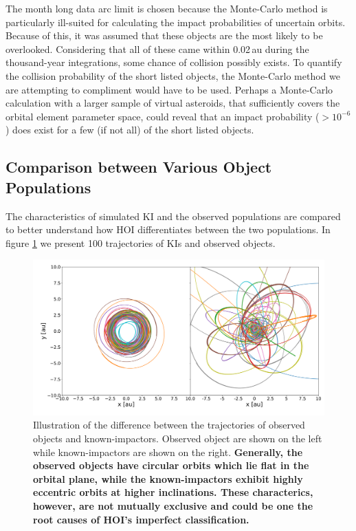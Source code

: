 \documentclass{aa}
\begin{document}
The month long data arc limit is chosen because the Monte-Carlo method is particularly ill-suited for calculating the impact probabilities of uncertain orbits. Because of this, it was assumed that these objects are the most likely to be overlooked. Considering that all of these came within 0.02\,au during the thousand-year integrations, some chance of collision possibly exists. To quantify the collision probability of the short listed objects, the Monte-Carlo method we are attempting to compliment would have to be used. Perhaps a Monte-Carlo calculation with a larger sample of virtual asteroids, that sufficiently covers the orbital element parameter space, could reveal that an impact probability ($>10^{-6}$) does exist for a few (if not all) of the short listed objects.  

\subsection{Comparison between Various Object Populations}
The characteristics of simulated KI and the observed populations are compared to better understand how HOI differentiates between the two populations. In figure \ref{FIG:Object_Trajectories} we present 100 trajectories of KIs and observed objects. 

\begin{figure}[h!]
    \hspace*{-0.40cm}
	\includegraphics[width=170mm]{images/5_Trajectories.pdf}
	\centering
	\caption{\label{FIG:Object_Trajectories} Illustration of the difference between the trajectories of observed objects and known-impactors. Observed object are shown on the left while known-impactors are shown on the right. \textbf{Generally, the observed objects have circular orbits which lie flat in the orbital plane, while the known-impactors exhibit highly eccentric orbits at higher inclinations. These characterics, however, are not mutually exclusive and could be one the root causes of HOI's imperfect classification.}}
\end{figure}
\end{document}
